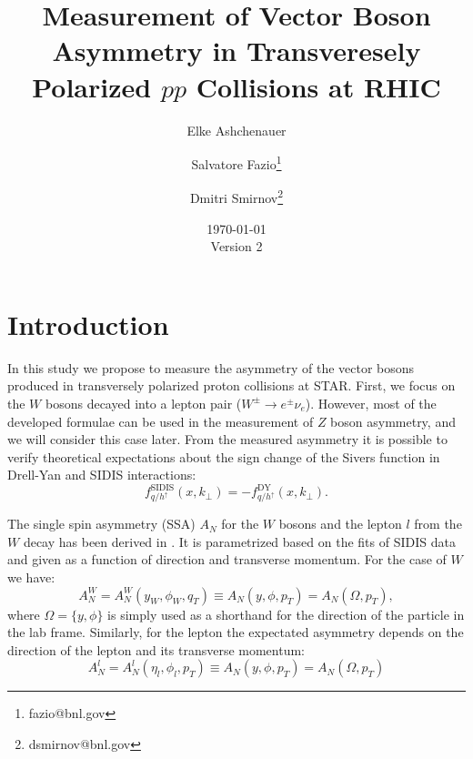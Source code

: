 \documentclass[12pt]{article}
\begin{document}
\setcounter{section}{0}
\setcounter{subsection}{0}
\setcounter{equation}{0}
\setcounter{figure}{0}
\setcounter{footnote}{0}
\setcounter{table}{0}


\title{Measurement of Vector Boson Asymmetry in Transveresely Polarized $pp$
Collisions at RHIC}

\author{Elke Ashchenauer}
\author{Salvatore Fazio\thanks{fazio@bnl.gov}}
\author{Dmitri Smirnov\thanks{dsmirnov@bnl.gov}}


\date{\today\\[1em]Version 2}

\maketitle

\newpage

\tableofcontents 

\newpage

\section{Introduction}

In this study we propose to measure the asymmetry of the vector bosons produced
in transversely polarized proton collisions at STAR. First, we focus on the $W$
bosons decayed into a lepton pair ($W^\pm \to e^\pm \nu_e$). However, most of the
developed formulae can be used in the measurement of $Z$ boson asymmetry, and
we will consider this case later. From the measured asymmetry it is possible to
verify theoretical expectations about the sign change of the Sivers function in
Drell-Yan and SIDIS interactions:
%
\begin{equation}
f^\text{SIDIS}_{q/h^\uparrow} (x, k_\perp) = - f^\text{DY}_{q/h^\uparrow} (x, k_\perp).
\end{equation}

The single spin asymmetry (SSA) $A_N$ for the $W$ bosons and the lepton $l$
from the $W$ decay has been derived in \cite{Kang:2009bp, zpaper}. It is
parametrized based on the fits of SIDIS data and given as a function of
direction and transverse momentum. For the case of $W$ we have:
%
\begin{equation}
A^W_N = A^W_N(y_W, \phi_W, q_T) \equiv A_N(y, \phi, p_T) = A_N(\Omega, p_T),
\label{eq:asym_wboson}
\end{equation}
%
where $\Omega = \{y, \phi\}$ is simply used as a shorthand for the direction of
the particle in the lab frame. Similarly, for the lepton the expectated
asymmetry depends on the direction of the lepton and its transverse momentum:
%
\begin{equation}
A^l_N = A^l_N(\eta_l, \phi_l, p_T) \equiv A_N(y, \phi, p_T) = A_N(\Omega, p_T)
\label{eq:asym_lepton}
\end{equation}
\end{document}
